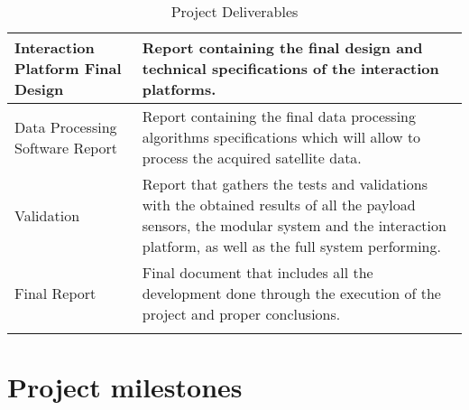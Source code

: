 \begin{longtable}[H]{>{\raggedright\arraybackslash}p{4cm} p{10cm}}
	Interaction Platform Final Design  & Report containing the final design and technical specifications of the interaction platforms.\vspace{0.2cm} \\
	
	\midrule

	Data Processing Software Report  & Report containing the final data processing algorithms specifications which will allow to process the acquired satellite data.\vspace{0.2cm} \\
	
	\midrule

	Validation & Report that gathers the tests and validations with the obtained results of all the payload sensors, the modular system and the interaction platform, as well as the full system performing.\vspace{0.2cm} \\
	
	\midrule
		
	Final Report & Final document that includes all the development done through the execution of the project and proper conclusions.\vspace{0.2cm} \\ 
	
	\bottomrule[2pt]
	
	\caption{Project Deliverables}
	\label{PDel}
\end{longtable}

\section{Project milestones}

